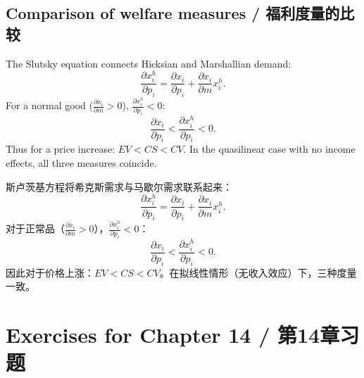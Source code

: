 \subsection{Comparison of welfare measures / 福利度量的比较}

\begin{original}
The Slutsky equation connects Hicksian and Marshallian demand:
\[
\frac{\partial x_i^h}{\partial p_i} = \frac{\partial x_i}{\partial p_i} + \frac{\partial x_i}{\partial m} x_i^h. \tag{14.23}
\]
For a normal good ($\frac{\partial x_i}{\partial m} > 0$), $\frac{\partial x_i^h}{\partial p_i} < 0$:
\[
\frac{\partial x_i}{\partial p_i} < \frac{\partial x_i^h}{\partial p_i} < 0. \tag{14.25}
\]
Thus for a price increase: $EV < CS < CV$. In the quasilinear case with no income effects, all three measures coincide.
\end{original}
\begin{translation}
斯卢茨基方程将希克斯需求与马歇尔需求联系起来：
\[
\frac{\partial x_i^h}{\partial p_i} = \frac{\partial x_i}{\partial p_i} + \frac{\partial x_i}{\partial m} x_i^h. \tag{14.23}
\]
对于正常品（$\frac{\partial x_i}{\partial m} > 0$），$\frac{\partial x_i^h}{\partial p_i} < 0$：
\[
\frac{\partial x_i}{\partial p_i} < \frac{\partial x_i^h}{\partial p_i} < 0. \tag{14.25}
\]
因此对于价格上涨：$EV < CS < CV$。在拟线性情形（无收入效应）下，三种度量一致。
\end{translation}

\section*{Exercises for Chapter 14 / 第14章习题}

